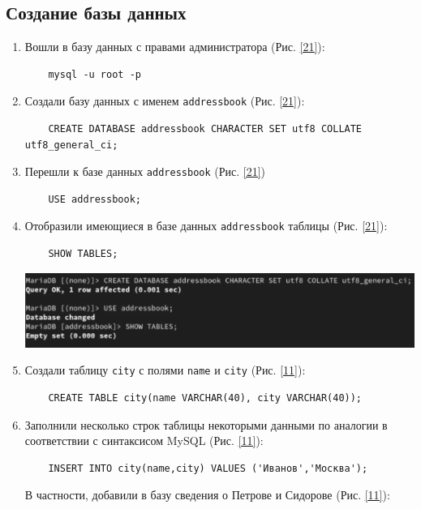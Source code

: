 \subsection{Создание базы данных}
\begin{enumerate}
\item Вошли в базу данных с правами администратора (Рис. \ref{21}):
  \begin{verbatim}
    mysql -u root -p
  \end{verbatim}
\item Создали базу данных с именем \texttt{addressbook} (Рис. \ref{21}):
  \begin{verbatim}
    CREATE DATABASE addressbook CHARACTER SET utf8 COLLATE utf8_general_ci;
  \end{verbatim}
\item Перешли к базе данных \texttt{addressbook} (Рис. \ref{21})
  \begin{verbatim}
    USE addressbook;
  \end{verbatim}
\item Отобразили имеющиеся в базе данных \texttt{addressbook} таблицы (Рис. \ref{21}):
  \begin{verbatim}
    SHOW TABLES;
  \end{verbatim}

\begin{center}
    \centering
    \includegraphics[width=\textwidth]{../images/image21.png}
    \label{21}
\end{center}

\item Создали таблицу \texttt{city} с полями \texttt{name} и \texttt{city} (Рис. \ref{11}):
  \begin{verbatim}
    CREATE TABLE city(name VARCHAR(40), city VARCHAR(40));
  \end{verbatim}

\item Заполнили несколько строк таблицы некоторыми данными по аналогии в соответствии с синтаксисом MySQL (Рис. \ref{11}):
  \begin{verbatim}
    INSERT INTO city(name,city) VALUES ('Иванов','Москва');
  \end{verbatim}
  В частности, добавили в базу сведения о Петрове и Сидорове (Рис. \ref{11}):


\end{enumerate}
